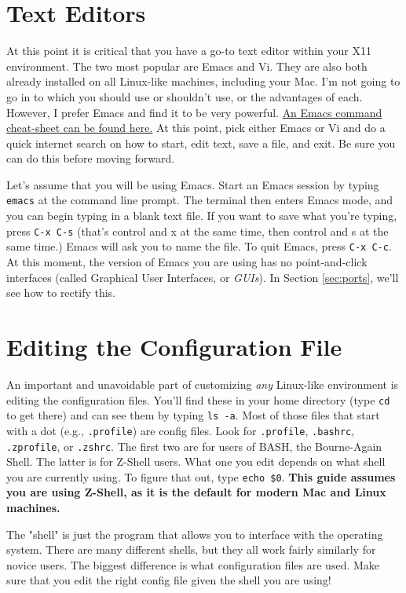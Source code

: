 \documentclass[12pt, letterpaper]{article}
\begin{document}
\section{Text Editors}
At this point it is critical that you have a go-to text editor within your
X11 environment.  The two most popular are Emacs and Vi.  They are also both
already installed on all Linux-like machines, including your Mac.
I'm not going to go in to which you should use or shouldn't use, or the
advantages of each.  However, I prefer Emacs and find it to be very powerful.
\href{https://www.gnu.org/software/emacs/refcards/pdf/refcard.pdf}{An
  Emacs command cheat-sheet can be found here.}  At this point, pick either
Emacs or Vi and do a quick internet search on how to start, edit text, save
a file, and exit.  Be sure you can do this before moving forward.

Let's assume that you will be using Emacs.  Start an Emacs session by
typing {\tt emacs} at the command line prompt.  The terminal then enters Emacs
mode, and you can begin typing in a blank text file.  If you want to save
what you're typing, press {\tt C-x C-s} (that's control and x at the same time,
then control and s at the same time.)  Emacs will ask you to name the file.
To quit Emacs, press {\tt C-x C-c}.  At this moment, the version of Emacs you are
using has no point-and-click interfaces (called Graphical User Interfaces, or
\emph{GUIs}).  In Section \ref{sec:ports}, we'll see how to rectify this.

\section{Editing the Configuration File}
An important and unavoidable part of customizing \emph{any} Linux-like
environment is editing the configuration files.  You'll find these in your
home directory (type {\tt cd} to get there) and can see them by typing
{\tt ls -a}.  Most of
those files that start with a dot (e.g., {\tt .profile}) are config files.
Look for {\tt .profile}, {\tt .bashrc}, {\tt .zprofile}, or {\tt .zshrc}.
The first two are for users of BASH, the
Bourne-Again Shell.  The latter is for Z-Shell users.  What one you edit
depends on what shell you are currently using.  To figure that out, type
{\tt echo \$0}.  \textbf{This guide assumes you are using Z-Shell, as it is the
  default for modern Mac and Linux machines.}

\begin{tcolorbox}[title=\textbf{Shell Shock}]
  The "shell" is just the program that allows you to interface with the
  operating system. There are many different shells, but they all work
  fairly similarly for novice users. The biggest difference is what configuration
  files are used. Make sure that you edit the right config file given the
  shell you are using!
\end{tcolorbox}
\end{document}
